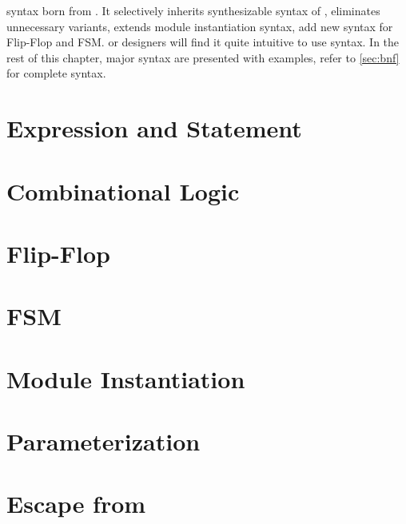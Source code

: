 \mhdl{} syntax born from \sv{}. It selectively
 inherits synthesizable syntax of \sv{}, eliminates unnecessary
variants, extends module instantiation syntax, add new syntax for
Flip-Flop and FSM. \vlog{} or \sv{} designers will find it quite
intuitive to use \mhdl{} syntax. In the rest of this chapter,
major syntax are presented with examples, refer to \autoref{sec:bnf} for complete syntax.

\section{Expression and Statement}
\section{Combinational Logic}
\section{Flip-Flop}
\section{FSM}\label{sec:syntax.fsm}
\section{Module Instantiation}
\section{Parameterization}
\section{Escape from \mhdl}
